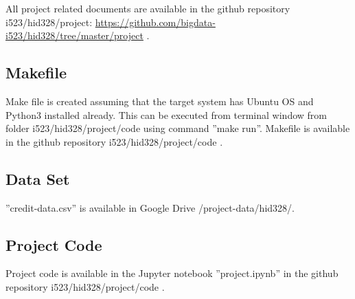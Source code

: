 \documentclass[sigconf]{acmart}
\begin{document}
All project related documents are available in the github repository i523/hid328/project:  \url{https://github.com/bigdata-i523/hid328/tree/master/project} \cite{github}.

\subsection{Makefile}\label{Makefile}

Make file is created assuming that the target system has Ubuntu OS and Python3 installed already. This can be executed from terminal window from folder i523/hid328/project/code using command ''make run''. Makefile is available in the github repository i523/hid328/project/code \cite{code}.

\subsection{Data Set}

''credit-data.csv'' is available in Google Drive /project-data/hid328/.

\subsection{Project Code}\label{Project Code}

Project code is available in the Jupyter notebook ''project.ipynb'' in the github repository i523/hid328/project/code \cite{code}.
\end{document}
